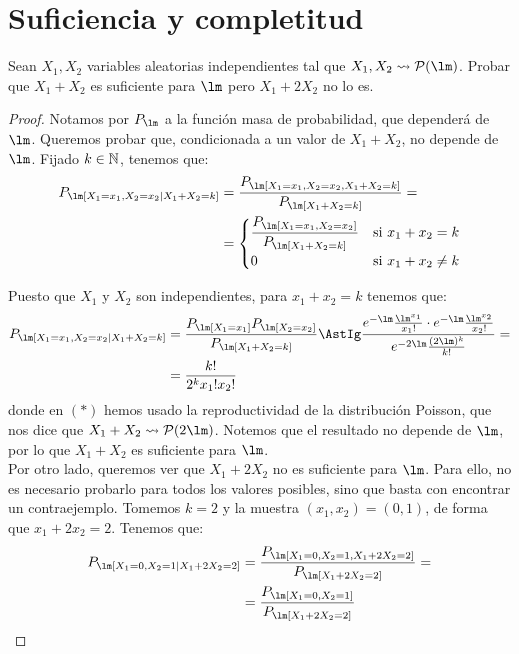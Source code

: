\section{Suficiencia y completitud}
\begin{ejemplo}
    Sean $X_1, X_2$ variables aleatorias independientes tal que $X_1,X_2\rightsquigarrow \cc{P}(\lm)$. Probar que $X_1+X_2$ es suficiente para $\lm$ pero $X_1+2X_2$ no lo es.
    \begin{proof}
        Notamos por $P_\lm$ a la función masa de probabilidad, que dependerá de $\lm$. Queremos probar que, condicionada a un valor de $X_1+X_2$, no depende de $\lm$. Fijado $k\in\mathbb{N}$, tenemos que:
        \begin{align*}
            P_\lm[X_1=x_1, X_2=x_2 \mid X_1+X_2=k] &= \dfrac{P_\lm[X_1=x_1, X_2=x_2, X_1+X_2=k]}{P_\lm[X_1+X_2=k]}
            =\\&= \begin{cases}
                \dfrac{P_\lm[X_1=x_1, X_2=x_2]}{P_\lm[X_1+X_2=k]} & \text{si } x_1+x_2=k \\
                0 & \text{si } x_1+x_2\neq k
            \end{cases}
        \end{align*}

        Puesto que $X_1$ y $X_2$ son independientes, para $x_1+x_2=k$ tenemos que:
        \begin{align*}
            P_\lm[X_1=x_1, X_2=x_2 \mid X_1+X_2=k] &= \dfrac{P_\lm[X_1=x_1] P_\lm[X_2=x_2]}{P_\lm[X_1+X_2=k]}
            \AstIg \dfrac{e^{-\lm}\frac{\lm^{x_1}}{x_1!} \cdot e^{-\lm}\frac{\lm^{x_2}}{x_2!}}{e^{-2\lm}\frac{(2\lm)^k}{k!}}
            = \\&= \dfrac{k!}{2^k x_1! x_2!}
        \end{align*}
        donde en $(\ast)$ hemos usado la reproductividad de la distribución Poisson, que nos dice que $X_1+X_2\rightsquigarrow \cc{P}(2\lm)$. Notemos que el resultado no depende de $\lm$, por lo que $X_1+X_2$ es suficiente para $\lm$.\\

        Por otro lado, queremos ver que $X_1+2X_2$ no es suficiente para $\lm$. Para ello, no es necesario probarlo para todos los valores posibles, sino que basta con encontrar un contraejemplo. Tomemos $k=2$ y la muestra $(x_1,x_2)=(0,1)$, de forma que $x_1+2x_2=2$. Tenemos que:
        \begin{align*}
            P_\lm[X_1=0, X_2=1 \mid X_1+2X_2=2] &= \dfrac{P_\lm[X_1=0, X_2=1, X_1+2X_2=2]}{P_\lm[X_1+2X_2=2]} =\\&= \dfrac{P_\lm[X_1=0, X_2=1]}{P_\lm[X_1+2X_2=2]}
        \end{align*}


\end{proof}
\end{ejemplo}
